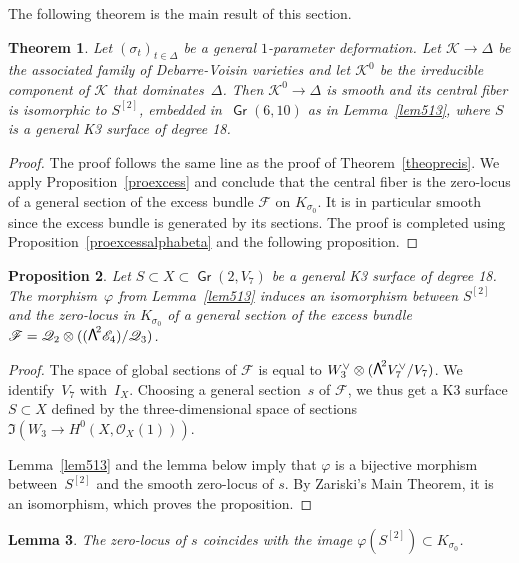 \documentclass[JEP,XML,SOM,Unicode, NoEqCountersInSection,NoFloatCountersInSection]{cedram}
\let\mathcal\mathscr
\newtheorem{lemm}{Lemma}[section]
\newtheorem{theo}[lemm]{Theorem}
\newtheorem{prop}[lemm]{Proposition}
\theoremstyle{definition}
\newcommand\cE{\mathcal{E}}
\newcommand\cF{\mathcal{F}}
\newcommand\cK{\mathcal{K}}
\newcommand\cO{\mathcal{O}}\let\OO\cO
\newcommand\cQ{\mathcal{Q}}\let\quotauto\cQ
\DeclareMathOperator{\Gr}{\mathsf{Gr}}
\let\phi\varphi
\newcommand\bw[1]{{\hbox{\large$\mathsf{\Lambda}$}^{\!#1}}}
\newcommand\hilbS{S^{[2]}}
\begin{document}
The following theorem is the main result of this section.

\begin{theo}\label{theogenre10}
Let $(\sigma_t)_{t\in \Delta}$ be a general $1$-parameter deformation.
Let $\cK\to\Delta$ be the associated family of Debarre-Voisin varieties and let $\cK^0$ be the irreducible component of $\cK$ that dominates~$\Delta$.
Then $\cK^0\to \Delta$
is smooth and its central fiber is isomorphic to $\hilbS$, embedded in~$\Gr(6,10)$ as in Lemma~\ref{lem513}, where
$S$ is a general K3 surface of degree 18.
\end{theo}

\begin{proof} The proof follows the same line as the proof of Theorem~\ref{theoprecis}. We apply Proposition~\ref{proexcess} and conclude that
the central fiber is the zero-locus of a general section of the excess bundle
$\cF$
on $K_{\sigma_0}$.
It is in particular smooth since the excess bundle is generated by its sections.
The proof is completed using Proposition~\ref{proexcessalphabeta} and the following proposition.\end{proof}

\begin{prop} \label{propidentexcessgenre10}
Let $S\subset X\subset \Gr(2,V_7)$ be a general K3 surface of degree 18. The morphism~$\phi$ from Lemma~\ref{lem513} induces an isomorphism between
$ \hilbS $ and the zero-locus in $K_{\sigma_0}$ of a general section of
the excess bundle $\cF=\cQ_2\otimes((\bw2\cE_4)/\cQ_3)$.
\end{prop}

\begin{proof} The space of global sections of $\cF$ is equal to $W_3^\vee\otimes (\bw2V_7^\vee/V_7)$. We identify~$V_7$ with~$I_X$. Choosing a general section~$s$ of $\cF$, we thus get a K3 surface $S\subset X$ defined by the three-dimensional space of sections
$\Im (W_3\to H^0(X,\cO_X(1)))$.

{Lemma~\ref{lem513} and the lemma below imply that $\phi$ is a bijective morphism between~$\hilbS$ and the smooth zero-locus of $s$. By Zariski's Main Theorem, it is an isomorphism, which proves the proposition.}
\end{proof}

\begin{lemm}\label{lem520}
The
zero-locus of $s$ coincides with the image $\phi(\hilbS )\subset K_{\sigma_0}$.
\end{lemm}
\end{document}
